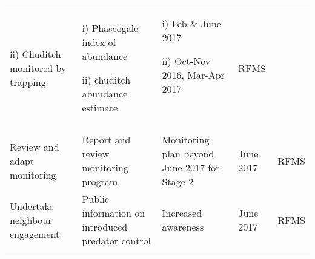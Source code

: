 \documentclass[version=last,
    paper=a4,                               %
    10pt,                                   %
    dvipsnames,
    oneside,                              %
    headings=openany,                       %
    open=any,
    BCOR=7mm,                               %
    DIV=15,     %
]{scrbook}
\begin{document}
\begin{longtable}[c]{@{}lllll@{}}
\begin{minipage}[t]{0.17\columnwidth}
ii) Chuditch monitored by trapping
\end{minipage} & \begin{minipage}[t]{0.17\columnwidth}\raggedright
i) Phascogale index of abundance

ii) chuditch abundance estimate
\end{minipage} & \begin{minipage}[t]{0.17\columnwidth}\raggedright
i) Feb \& June 2017

ii) Oct-Nov 2016, Mar-Apr 2017

~
\end{minipage} & \begin{minipage}[t]{0.17\columnwidth}\raggedright
RFMS
\end{minipage}
\\\addlinespace
\begin{minipage}[t]{0.17\columnwidth}\raggedright
Review and adapt monitoring
\end{minipage} & \begin{minipage}[t]{0.17\columnwidth}\raggedright
Report and review monitoring program
\end{minipage} & \begin{minipage}[t]{0.17\columnwidth}\raggedright
Monitoring plan beyond June 2017 for Stage 2
\end{minipage} & \begin{minipage}[t]{0.17\columnwidth}\raggedright
June 2017
\end{minipage} & \begin{minipage}[t]{0.17\columnwidth}\raggedright
RFMS
\end{minipage}
\\\addlinespace
\begin{minipage}[t]{0.17\columnwidth}\raggedright
Undertake neighbour engagement
\end{minipage} & \begin{minipage}[t]{0.17\columnwidth}\raggedright
Public information on introduced predator control
\end{minipage} & \begin{minipage}[t]{0.17\columnwidth}\raggedright
Increased awareness
\end{minipage} & \begin{minipage}[t]{0.17\columnwidth}\raggedright
June 2017
\end{minipage} & \begin{minipage}[t]{0.17\columnwidth}\raggedright
RFMS
\end{minipage}
\\\addlinespace

\end{longtable}
\end{document}
